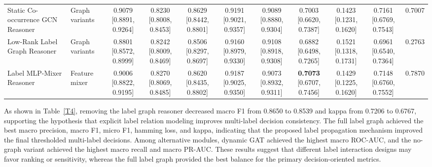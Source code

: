 \documentclass[Afour,sagev,times]{sagej}
\begin{document}
\begin{table}[h]
{\begin{tabular}{ll*{9}{c}}
Static Co-occurrence GCN Reasoner & Graph variants & \shortstack{0.9079\\{[}0.8891, 0.9264{]}} & \shortstack{0.8230\\{[}0.8008, 0.8453{]}} & \shortstack{0.8629\\{[}0.8442, 0.8801{]}} & \shortstack{0.9191\\{[}0.9021, 0.9357{]}} & \shortstack{0.9089\\{[}0.8880, 0.9304{]}} & \shortstack{0.7003\\{[}0.6620, 0.7387{]}} & \shortstack{0.1423\\{[}0.1231, 0.1620{]}} & \shortstack{0.7161\\{[}0.6769, 0.7543{]}} & 0.7007 \\
Low-Rank Label Graph Reasoner & Graph variants & \shortstack{0.8801\\{[}0.8572, 0.8999{]}} & \shortstack{0.8242\\{[}0.8009, 0.8469{]}} & \shortstack{0.8506\\{[}0.8297, 0.8697{]}} & \shortstack{0.9160\\{[}0.8979, 0.9330{]}} & \shortstack{0.9108\\{[}0.8918, 0.9308{]}} & \shortstack{0.6882\\{[}0.6498, 0.7265{]}} & \shortstack{0.1521\\{[}0.1318, 0.1731{]}} & \shortstack{0.6961\\{[}0.6540, 0.7364{]}} & 0.2763 \\
Label MLP-Mixer Reasoner & Feature mixer & \shortstack{0.9006\\{[}0.8822, 0.9195{]}} & \shortstack{0.8270\\{[}0.8069, 0.8485{]}} & \shortstack{0.8620\\{[}0.8435, 0.8802{]}} & \shortstack{0.9187\\{[}0.9025, 0.9350{]}} & \shortstack{0.9073\\{[}0.8932, 0.9311{]}} & \shortstack{\textbf{0.7073}\\{[}0.6707, 0.7456{]}} & \shortstack{0.1429\\{[}0.1225, 0.1620{]}} & \shortstack{0.7148\\{[}0.6760, 0.7552{]}} & 0.7870 \\
\bottomrule
\end{tabular}
}
\end{table}

As shown in Table~\ref{T4}, removing the label graph reasoner decreased macro F1 from 0.8650 to 0.8539 and kappa from 0.7206 to 0.6767, supporting the hypothesis that explicit label relation modeling improves multi-label decision consistency. The full label graph achieved the best macro precision, macro F1, micro F1, hamming loss, and kappa, indicating that the proposed label propagation mechanism improved the final thresholded multi-label decisions. Among alternative modules, dynamic GAT achieved the highest macro ROC-AUC, and the no-graph variant achieved the highest macro recall and macro PR-AUC. These results suggest that different label interaction designs may favor ranking or sensitivity, whereas the full label graph provided the best balance for the primary decision-oriented metrics.
\end{document}

